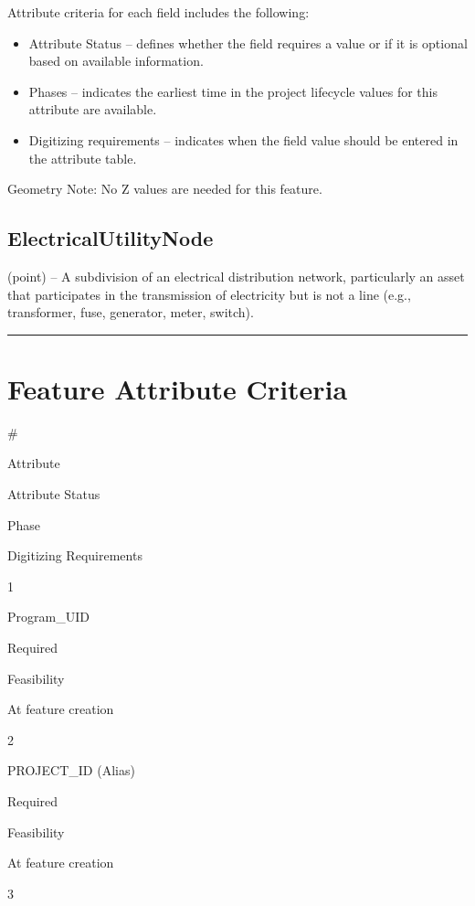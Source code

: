 \documentclass[
  letterpaper,
  DIV=11,
  numbers=noendperiod]{scrreprt}
\providecommand{\tightlist}{%
  \setlength{\itemsep}{0pt}\setlength{\parskip}{0pt}}
\begin{document}
Attribute criteria for each field includes the following:

\begin{itemize}
\tightlist
\item
  Attribute Status -- defines whether the field requires a value or if
  it is optional based on available information.
\item
  Phases -- indicates the earliest time in the project lifecycle values
  for this attribute are available.
\item
  Digitizing requirements -- indicates when the field value should be
  entered in the attribute table.
\end{itemize}

Geometry Note: No Z values are needed for this feature.

\subsection{ElectricalUtilityNode}\label{electricalutilitynode}

(point) -- A subdivision of an electrical distribution network,
particularly an asset that participates in the transmission of
electricity but is not a line (e.g., transformer, fuse, generator,
meter, switch).

\begin{center}\rule{0.5\linewidth}{0.5pt}\end{center}

\section{Feature Attribute
Criteria}\label{feature-attribute-criteria-19}

\#

Attribute

Attribute Status

Phase

Digitizing Requirements

1

Program\_UID

Required

Feasibility

At feature creation

2

PROJECT\_ID (Alias)

Required

Feasibility

At feature creation

3
\end{document}
